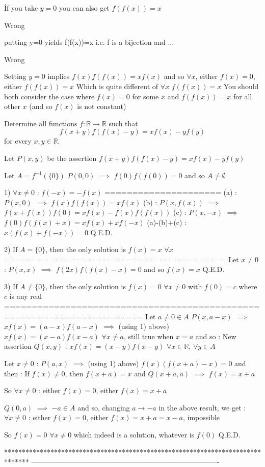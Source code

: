 \begin{solution}
	\begin{tcolorbox}İf you take $y=0$ you can also get $f(f(x))=x$\end{tcolorbox}
Wrong

\begin{tcolorbox}putting y=0 yields f(f(x))=x i.e. f is a bijection and ...\end{tcolorbox}
Wrong

Setting $y=0$ implies $f(x)f(f(x))=xf(x)$ and so $\forall x$, either $f(x)=0$, either $f(f(x))=x$
Which is quite different of $\forall x$ $f(f(x))=x$
You should both consider the case where $f(x)=0$ for some $x$ and $f(f(x))=x$ for all other $x$ (and so $f(x)$ is not constant)
\end{solution}



\begin{solution}
	\begin{tcolorbox}Determine all functions $f:\mathbb{R} \to \mathbb{R}$ such that \[f(x+y)f(f(x)-y)=xf(x)-yf(y)\] for every $x,y \in \mathbb{R}$.\end{tcolorbox}
Let $P(x,y)$ be the assertion $f(x+y)f(f(x)-y)=xf(x)-yf(y)$

Let $A=f^{-1}(\{0\})$
$P(0,0)$ $\implies$ $f(0)f(f(0))=0$ and so $A\ne\emptyset$


1) $\forall x\ne 0$ : $f(-x)=-f(x)$
=====================
(a) : $P(x,0)$ $\implies$ $f(x)f(f(x))=xf(x)$
(b) : $P(x,f(x))$ $\implies$ $f(x+f(x))f(0)=xf(x)-f(x)f(f(x))$
(c) : $P(x,-x)$ $\implies$ $f(0)f(f(x)+x)=xf(x)+xf(-x)$
(a)-(b)+(c) : $x(f(x)+f(-x))=0$
Q.E.D.

2) If $A=\{0\}$, then the only solution is $f(x)=x$ $\forall x$
========================================
Let $x\ne 0$ : $P(x,x)$ $\implies$ $f(2x)f(f(x)-x)=0$ and so $f(x)=x$
Q.E.D.

3) If $A\ne\{0\}$, then the only solution is $f(x)=0$ $\forall x\ne 0$ with $f(0)=c$ where $c$ is any real
=======================================================================
Let $a\ne 0\in A$
$P(x,a-x)$ $\implies$ $xf(x)=(a-x)f(a-x)$ $\implies$ (using 1) above) $xf(x)=(x-a)f(x-a)$ $\forall x\ne a$, still true when $x=a$ and so :
New assertion $Q(x,y)$ : $xf(x)=(x-y)f(x-y)$ $\forall x\in\mathbb R$, $\forall y\in A$

Let $x\ne 0$ : $P(a,x)$ $\implies$ (using 1) above) $f(x)(f(x+a)-x)=0$ and then :
If $f(x)\ne 0$, then $f(x+a)=x$ and $Q(x+a,a)$ $\implies$ $f(x)=x+a$

So $\forall x\ne 0$ : either $f(x)=0$, either $f(x)=x+a$

$Q(0,a)$ $\implies$ $-a\in A$ and so, changing $a\to -a$ in the above result, we get :
$\forall x\ne 0$ : either $f(x)=0$, either $f(x)=x+a=x-a$, impossible

So $f(x)=0$ $\forall x\ne 0$ which indeed is a solution, whatever is $f(0)$
Q.E.D.
\end{solution}
*******************************************************************************
-------------------------------------------------------------------------------

